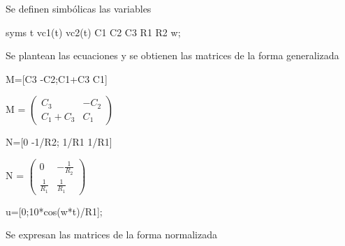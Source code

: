 \documentclass[10pt,a4paper]{article} %
\begin{document}
\begin{par}
	\begin{flushleft}
		Se definen simbólicas las variables
	\end{flushleft}
\end{par}

\begin{matlabcode}
	syms t vc1(t) vc2(t) C1 C2 C3 R1 R2 w;
\end{matlabcode}

\begin{par}
	\begin{flushleft}
		Se plantean las ecuaciones y se obtienen las matrices de la forma generalizada
	\end{flushleft}
\end{par}

\begin{matlabcode}
	M=[C3 -C2;C1+C3 C1]
\end{matlabcode}
\begin{matlabsymbolicoutput}
	M = 
	$\displaystyle \left(\begin{array}{cc}
	C_3  & -C_2 \\
	C_1 +C_3  & C_1 
	\end{array}\right)$
\end{matlabsymbolicoutput}
\begin{matlabcode}
	N=[0 -1/R2; 1/R1 1/R1]
\end{matlabcode}
\begin{matlabsymbolicoutput}
	N = 
	$\displaystyle \left(\begin{array}{cc}
	0 & -\frac{1}{R_2 }\\
	\frac{1}{R_1 } & \frac{1}{R_1 }
	\end{array}\right)$
\end{matlabsymbolicoutput}
\begin{matlabcode}
	u=[0;10*cos(w*t)/R1];
\end{matlabcode}

\begin{par}
	\begin{flushleft}
		Se expresan las matrices de la forma normalizada
	\end{flushleft}
\end{par}
\end{document}
